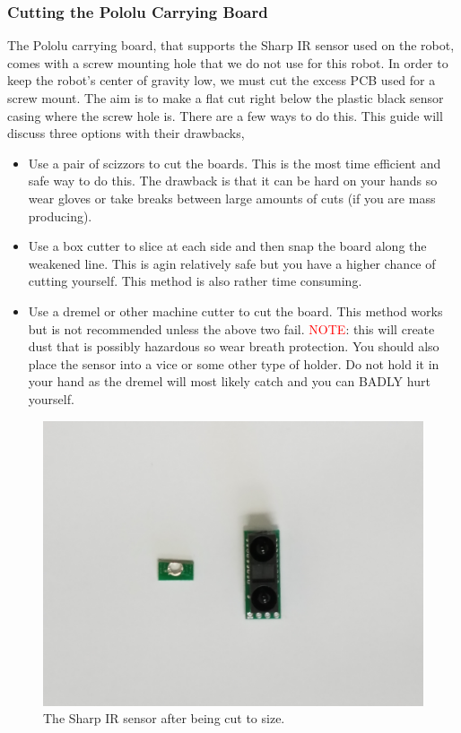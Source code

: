  \subsubsection{Cutting the Pololu Carrying Board}
 \label{sec:cutSharp}
 
 The Pololu carrying board, that supports the Sharp IR sensor used on the robot, comes with a screw mounting hole that we do not use for this robot. In order to keep the robot's center of gravity low, we must cut the excess PCB used for a screw mount. The aim is to make a flat cut right below the plastic black sensor casing where the screw hole is. There are a few ways to do this. This guide will discuss three options with their drawbacks,
 
 \begin{itemize}
 \item Use a pair of scizzors to cut the boards. This is the most time efficient and safe way to do this. The drawback is that it can be hard on your hands so wear gloves or take breaks between large amounts of cuts (if you are mass producing).
 \item Use a box cutter to slice at each side and then snap the board along the weakened line. This is agin relatively safe but you have a higher chance of cutting yourself. This method is also rather time consuming.
 \item Use a dremel or other machine cutter to cut the board. This method works but is not recommended unless the above two fail. {\textcolor{red}{NOTE}}: this will create dust that is possibly hazardous so wear breath protection. You should also place the sensor into a vice or some other type of holder. Do not hold it in your hand as the dremel will most likely catch and you can BADLY hurt yourself.
 \end{itemize} 
 
\begin{figure}[h!]
\centering
\includegraphics[trim={15cm 15cm 15cm 10cm},clip=true,width=0.65\columnwidth, keepaspectratio]{./figs/20181121_111015.jpg}
\caption{The Sharp IR sensor after being cut to size.}
\label{fig:cutSharp}
\end{figure}


